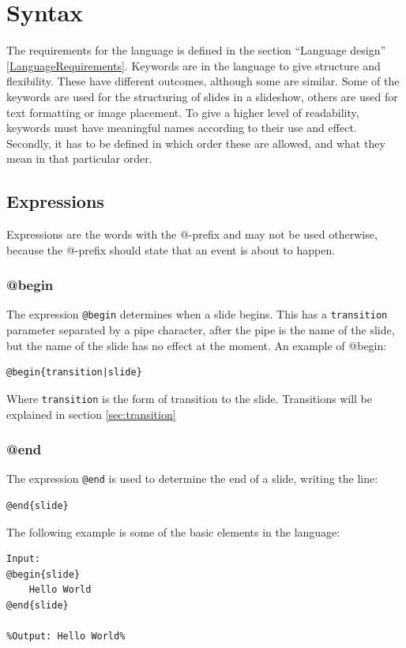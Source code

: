 \chapter{Syntax}
\label{SSyntax}

The requirements for the language is defined in the section ``Language design'' \ref{LanguageRequirements}. Keywords are in the language to give structure and flexibility. These have different outcomes, although some are similar. Some of the keywords are used for the structuring of slides in a slideshow, others are used for text formatting or image placement. To give a higher level of readability, keywords must have meaningful names according to their use and effect. Secondly, it has to be defined in which order these are allowed, and what they mean in that particular order.

\section{Expressions}
Expressions are the words with the @-prefix and may not be used otherwise, because the @-prefix should state that an event is about to happen.

\subsection{@begin}
\label{@begin}
The expression \texttt{@begin} determines when a slide begins. This has a \texttt{transition} parameter separated by a pipe character, after the pipe is the name of the slide, but the name of the slide has no effect at the moment. An example of @begin:
\begin{lstlisting}[frame=single]
@begin{transition|slide}
\end{lstlisting}
Where \texttt{transition} is the form of transition to the slide. Transitions will be explained in section \ref{sec:transition}

\subsection{@end}
\label{@end}
The expression \texttt{@end} is used to determine the end of a slide, writing the line: 
\begin{lstlisting}[frame=single]
@end{slide}
\end{lstlisting}

The following example is some of the basic elements in the language:
\begin{lstlisting}[frame=single]
Input:
@begin{slide}
    Hello World
@end{slide}

%Output: Hello World%
\end{lstlisting}

